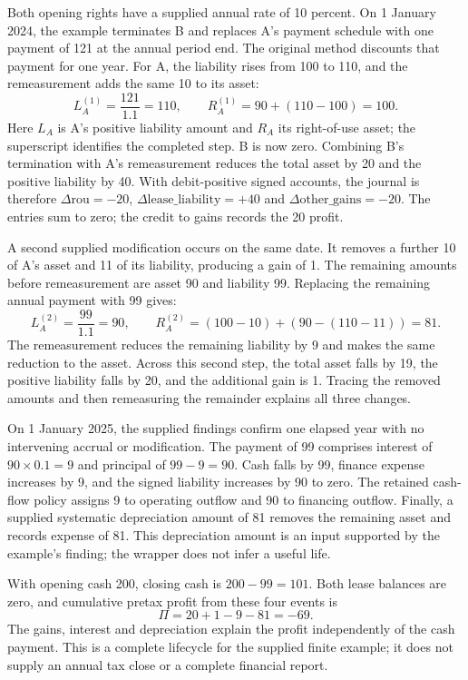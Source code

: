Both opening rights have a supplied annual rate of 10 percent. On 1 January
2024, the example terminates B and replaces A's payment schedule with one
payment of 121 at the annual period end. The original method discounts that
payment for one year. For A, the liability rises from 100 to 110, and the
remeasurement adds the same 10 to its asset:
\[
  L_A^{(1)}=\frac{121}{1.1}=110,
  \qquad R_A^{(1)}=90+(110-100)=100.
\]
Here $L_A$ is A's positive liability amount and $R_A$ its right-of-use asset;
the superscript identifies the completed step. B is now zero. Combining B's
termination with A's remeasurement reduces the total asset by 20 and the
positive liability by 40. With debit-positive signed accounts, the journal is
therefore $\Delta\mathrm{rou}=-20$,
$\Delta\mathrm{lease\_liability}=+40$ and
$\Delta\mathrm{other\_gains}=-20$. The entries sum to zero; the credit to
gains records the 20 profit.

A second supplied modification occurs on the same date. It removes a further
10 of A's asset and 11 of its liability, producing a gain of 1. The remaining
amounts before remeasurement are asset 90 and liability 99. Replacing the
remaining annual payment with 99 gives:
\[
  L_A^{(2)}=\frac{99}{1.1}=90,
  \qquad R_A^{(2)}=(100-10)+(90-(110-11))=81.
\]
The remeasurement reduces the remaining liability by 9 and makes the same
reduction to the asset. Across this second step, the total asset falls by 19,
the positive liability falls by 20, and the additional gain is 1. Tracing the
removed amounts and then remeasuring the remainder explains all three changes.

On 1 January 2025, the supplied findings confirm one elapsed year with no
intervening accrual or modification. The payment of 99 comprises interest of
$90\times0.1=9$ and principal of $99-9=90$. Cash falls by 99, finance expense
increases by 9, and the signed liability increases by 90 to zero. The retained
cash-flow policy assigns 9 to operating outflow and 90 to financing outflow.
Finally, a supplied systematic depreciation amount of 81 removes the remaining
asset and records expense of 81. This depreciation amount is an input supported
by the example's finding; the wrapper does not infer a useful life.

With opening cash 200, closing cash is $200-99=101$. Both lease balances are
zero, and cumulative pretax profit from these four events is
\[
  \Pi=20+1-9-81=-69.
\]
The gains, interest and depreciation explain the profit independently of the
cash payment. This is a complete lifecycle for the supplied finite example;
it does not supply an annual tax close or a complete financial report.

